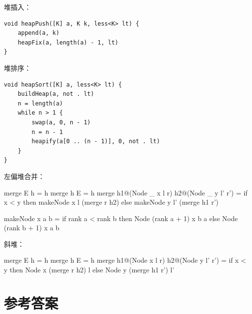 \documentclass[b5paper]{ctexart}
\begin{document}
堆插入：

\begin{lstlisting}[language = Bourbaki]
void heapPush([K] a, K k, less<K> lt) {
    append(a, k)
    heapFix(a, length(a) - 1, lt)
}
\end{lstlisting}

堆排序：

\begin{lstlisting}[language = Bourbaki]
void heapSort([K] a, less<K> lt) {
    buildHeap(a, not . lt)
    n = length(a)
    while n > 1 {
        swap(a, 0, n - 1)
        n = n - 1
        heapify(a[0 .. (n - 1)], 0, not . lt)
    }
}
\end{lstlisting}

左偏堆合并：

\begin{Haskell}
merge E h = h
merge h E = h
merge h1@(Node _ x l r) h2@(Node _ y l' r') =
    if x < y then makeNode x l (merge r h2)
    else makeNode y l' (merge h1 r')

makeNode x a b = if rank a < rank b then Node (rank a + 1) x b a
                 else Node (rank b + 1) x a b
\end{Haskell}

斜堆：

\begin{Haskell}
merge E h = h
merge h E = h
merge h1@(Node x l r) h2@(Node y l' r') =
    if x < y then Node x (merge r h2) l
    else Node y (merge h1 r') l'
\end{Haskell}


\ifx\wholebook\relax \else
\section{参考答案}
\shipoutAnswer
\end{document}
